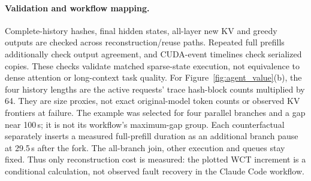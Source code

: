 \documentclass[sigplan,10pt,anonymous,nonacm]{acmart}
\begin{document}
\paragraph{Validation and workflow mapping.}
Complete-history hashes, final hidden states, all-layer new KV and greedy
outputs are checked across reconstruction/reuse paths. Repeated full
prefills additionally check output agreement, and CUDA-event timelines
check serialized copies. These checks validate matched sparse-state
execution, not equivalence to dense attention or long-context task quality.
For Figure~\ref{fig:agent_value}(b), the four history lengths
are the active requests' trace hash-block counts multiplied by 64.
They are size proxies, not exact original-model token counts or observed
KV frontiers at failure. The example was selected for four parallel
branches and a gap near 100\,s; it is not its workflow's maximum-gap group.
Each counterfactual separately inserts a measured full-prefill duration
as an additional branch pause at 29.5\,s after the fork. The all-branch
join, other execution and queues stay fixed. Thus only reconstruction
cost is measured: the plotted WCT increment is a conditional calculation,
not observed fault recovery in the Claude Code workflow.
\end{document}

